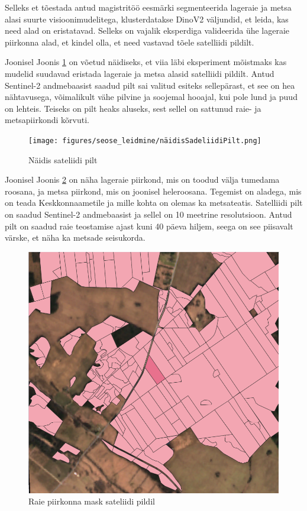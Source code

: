 Selleks et tõestada antud magistritöö eesmärki segmenteerida lageraie ja metsa alasi suurte visioonimudelitega, klusterdatakse DinoV2 väljundid, et leida, kas need alad on eristatavad. Selleks on vajalik eksperdiga valideerida ühe lageraie piirkonna alad, et kindel olla, et need vastavad tõele satelliidi pildilt.

Joonisel Joonis \ref{fig:näidisSadeliidiPilt} on võetud näidiseks, et viia läbi eksperiment mõistmaks kas mudelid suudavad eristada lageraie ja metsa alasid satelliidi pildilt. Antud Sentinel-2 andmebaasist saadud pilt sai valitud esiteks sellepärast, et see on hea nähtavusega, võimalikult vähe pilvine ja soojemal hooajal, kui pole lund ja puud on lehteis. Teiseks on pilt heaks aluseks, sest sellel on sattunud raie- ja metsapiirkondi kõrvuti.

\begin{figure}[H]
    \centering
    \texttt{[image: figures/seose\_leidmine/näidisSadeliidiPilt.png]}
    \caption{Näidis sateliidi pilt}
    \label{fig:näidisSadeliidiPilt}
\end{figure}

Joonisel Joonis \ref{fig:raieInfoMask} on näha lageraie piirkond, mis on toodud välja tumedama roosana, ja metsa piirkond, mis on joonisel heleroosana. Tegemist on aladega, mis on teada Keskkonnaametile ja mille kohta on olemas ka metsateatis. Satelliidi pilt on saadud Sentinel-2 andmebaasist ja sellel on 10 meetrine resolutsioon. Antud pilt on saadud raie teostamise ajast kuni 40 päeva hiljem, seega on see piisavalt värske, et näha ka metsade seisukorda.

\begin{figure}[H]
    \centering
    \includegraphics[width=.7\textwidth]{figures/seose_leidmine/raieInfoMask.png}
    \caption{Raie piirkonna mask sateliidi pildil}
    \label{fig:raieInfoMask}
\end{figure}

